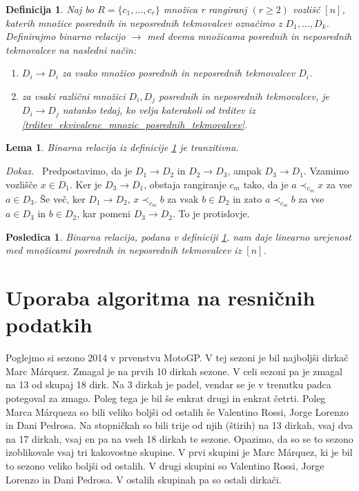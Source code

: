 \documentclass[a4paper, 12pt]{book}
\newtheorem{definicija}{Definicija}[chapter]
\newtheorem{lema}{Lema}[chapter]
\newtheorem{posledica}{Posledica}[chapter]
\newenvironment{dokaz}{\emph{Dokaz.}\ }{\hspace{\fill}{$\Box$}}
\begin{document}
\begin{definicija}
\label{definicija_relacije_mnozic_posrednih_tekmovalcev}
    Naj bo $R = \{ c_1, ..., c_r \}$ množica r rangiranj $(r \geq 2)$ vozlišč $[n]$, katerih množice posrednih in neposrednih tekmovalcev označimo z $D_1, ..., D_k$. Definirajmo binarno relacijo $\rightarrow$ med dvema množicama posrednih in neposrednih tekmovalcev na nasledni način:
    \begin{enumerate}[label=(\roman*)]
        \item $D_i \rightarrow D_i$ za vsako množico posrednih in neposrednih tekmovalcev $D_i$.
        \item za vsaki različni množici $D_i, D_j$ posrednih in neposrednih tekmovalcev, je $D_i \rightarrow D_j$ natanko tedaj, ko velja katerakoli od trditev iz \ref{trditev_ekvivalenc_mnozic_posrednih_tekmovalcev}.
    \end{enumerate}
\end{definicija}

\begin{lema}
    Binarna relacija iz definicije \ref{definicija_relacije_mnozic_posrednih_tekmovalcev} je tranzitivna.
\end{lema}
\begin{dokaz}
    Predpostavimo, da je $D_1 \rightarrow D_2$ in $D_2 \rightarrow D_3$, ampak $D_3 \rightarrow D_1$. Vzamimo vozlišče $x \in D_1$. Ker je $D_3 \rightarrow D_1$, obstaja rangiranje $c_m$ tako, da je $a \prec_{c_m} x$ za vse $a \in D_3$. Še več, ker $D_1 \rightarrow D_2$, $x \prec_{c_m} b$ za vsak $b \in D_2$ in zato $a \prec_{c_m} b$ za vse $a \in D_3$ in $b \in D_2$, kar pomeni $D_3 \rightarrow D_2$. To je protislovje.
\end{dokaz}

\begin{posledica}
    Binarna relacija, podana v definiciji \ref{definicija_relacije_mnozic_posrednih_tekmovalcev}, nam daje linearno urejenost med množicami posrednih in neposrednih tekmovalcev iz $[n]$.
\end{posledica}

\chapter{ Uporaba algoritma na resničnih podatkih }

Poglejmo si sezono 2014 v prvenstvu MotoGP. V tej sezoni je bil najboljši dirkač Marc Márquez. Zmagal je na prvih 10 dirkah sezone. V celi sezoni pa je zmagal na 13 od skupaj 18 dirk. Na 3 dirkah je padel, vendar se je v trenutku padca potegoval za zmago. Poleg tega je bil še enkrat drugi in enkrat četrti. Poleg Marca Márqueza so bili veliko boljši od ostalih še Valentino Rossi, Jorge Lorenzo in Dani Pedrosa. Na stopničkah so bili trije od njih (štirih) na 13 dirkah, vsaj dva na 17 dirkah, vsaj en pa na vseh 18 dirkah te sezone. Opazimo, da so se to sezono izoblikovale vsaj tri kakovostne skupine. V prvi skupini je Marc Márquez, ki je bil to sezono veliko boljši od ostalih. V drugi skupini so Valentino Rossi, Jorge Lorenzo in Dani Pedrosa. V ostalih skupinah pa so ostali dirkači.
\end{document}
